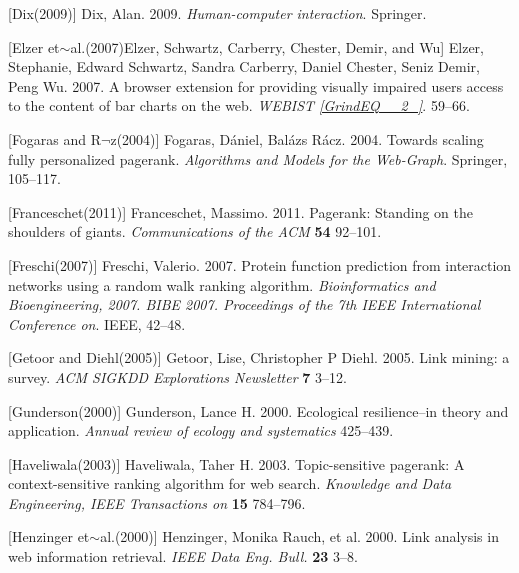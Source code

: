 \documentclass{article} %
\begin{document}
\noindent 

[Dix(2009)]  Dix, Alan. 2009.    \textit{ Human-computer interaction}.    Springer.

\noindent 

[Elzer et$\sim$al.(2007)Elzer, Schwartz, Carberry, Chester, Demir, and Wu]  Elzer, Stephanie, Edward Schwartz, Sandra Carberry, Daniel Chester, Seniz Demir, Peng Wu. 2007.    A browser extension for providing visually impaired users access to the content of bar charts on the web.    \textit{ WEBIST \eqref{GrindEQ__2_}}. 59--66.

\noindent 

[Fogaras and R$\neg$z(2004)]  Fogaras, D\'{a}niel, Bal\'{a}zs R\'{a}cz. 2004.    Towards scaling fully personalized pagerank.    \textit{ Algorithms and Models for the Web-Graph}. Springer, 105--117.

\noindent 

[Franceschet(2011)]  Franceschet, Massimo. 2011.    Pagerank: Standing on the shoulders of giants.    \textit{ Communications of the ACM} \textbf{ 54} 92--101.

\noindent 

[Freschi(2007)]  Freschi, Valerio. 2007.    Protein function prediction from interaction networks using a random walk ranking algorithm.    \textit{ Bioinformatics and Bioengineering, 2007. BIBE 2007. Proceedings of the 7th IEEE International Conference on}. IEEE, 42--48.

\noindent 

[Getoor and Diehl(2005)]  Getoor, Lise, Christopher P Diehl. 2005.    Link mining: a survey.    \textit{ ACM SIGKDD Explorations Newsletter} \textbf{ 7} 3--12.

\noindent 

[Gunderson(2000)]  Gunderson, Lance H. 2000.    Ecological resilience--in theory and application.    \textit{ Annual review of ecology and systematics} 425--439.

\noindent 

[Haveliwala(2003)]  Haveliwala, Taher H. 2003.    Topic-sensitive pagerank: A context-sensitive ranking algorithm for web search.    \textit{ Knowledge and Data Engineering, IEEE Transactions on} \textbf{ 15} 784--796.

\noindent 

[Henzinger et$\sim$al.(2000)]  Henzinger, Monika Rauch, et al. 2000.    Link analysis in web information retrieval.    \textit{ IEEE Data Eng. Bull.} \textbf{ 23} 3--8.

\noindent 
\end{document}
